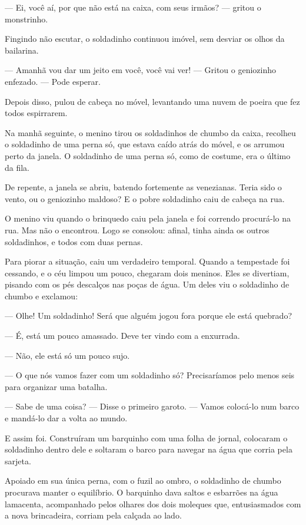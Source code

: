 \begin{conteudo}
\begin{conteudo}
\begin{conteudo}
\begin{conteudo}
\begin{conteudo}
\begin{myquote}
--- Ei, você aí, por que não está na caixa, com seus irmãos? --- gritou
o monstrinho.

Fingindo não escutar, o soldadinho continuou imóvel, sem desviar os
olhos da bailarina.

--- Amanhã vou dar um jeito em você, você vai ver! --- Gritou o geniozinho
enfezado. --- Pode esperar.

Depois disso, pulou de cabeça no móvel, levantando uma nuvem de poeira que fez todos espirrarem.

Na manhã seguinte, o menino tirou os soldadinhos de chumbo da caixa,
recolheu o soldadinho de uma perna só, que estava caído atrás do móvel, e
os arrumou perto da janela. O soldadinho de uma perna só, como de
costume, era o último da fila.

De repente, a janela se abriu, batendo fortemente as venezianas. Teria
sido o vento, ou o geniozinho maldoso? E o pobre soldadinho caiu de
cabeça na rua.

O menino viu quando o brinquedo caiu pela janela e foi correndo
procurá-lo na rua. Mas não o encontrou. Logo se consolou: afinal, tinha
ainda os outros soldadinhos, e todos com duas pernas.

Para piorar a situação, caiu um verdadeiro temporal. Quando a tempestade
foi cessando, e o céu limpou um pouco, chegaram dois meninos. Eles se
divertiam, pisando com os pés descalços nas poças de água. Um deles viu
o soldadinho de chumbo e exclamou:

--- Olhe! Um soldadinho! Será que alguém jogou fora porque ele está
quebrado?

--- É, está um pouco amassado. Deve ter vindo com a enxurrada.

--- Não, ele está só um pouco sujo.

--- O que nós vamos fazer com um soldadinho só? Precisaríamos pelo menos
seis para organizar uma batalha.

--- Sabe de uma coisa? --- Disse o primeiro garoto. --- Vamos colocá-lo
num barco e mandá-lo dar a volta ao mundo.

E assim foi. Construíram um barquinho com uma folha de jornal, colocaram
o soldadinho dentro dele e soltaram o barco para navegar na água que
corria pela sarjeta.

Apoiado em sua única perna, com o fuzil ao ombro, o soldadinho de chumbo
procurava manter o equilíbrio. O barquinho dava saltos e esbarrões na
água lamacenta, acompanhado pelos olhares dos dois moleques que,
entusiasmados com a nova brincadeira, corriam pela calçada ao lado.


\end{myquote}
\end{conteudo}
\end{conteudo}
\end{conteudo}
\end{conteudo}
\end{conteudo}
